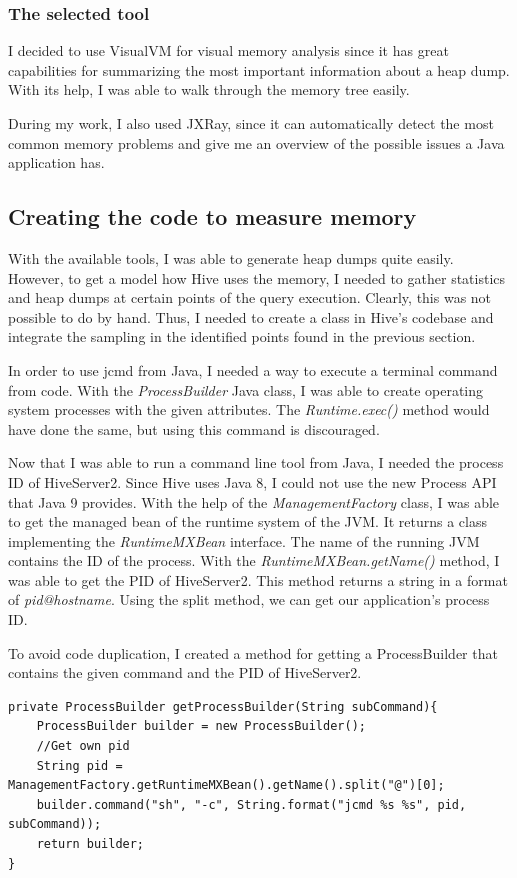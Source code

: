 \subsubsection{The selected tool}
I decided to use VisualVM for visual memory analysis since it has great capabilities for summarizing the most important information about a heap dump. With its help, I was able to walk through the memory tree easily.

During my work, I also used JXRay, since it can automatically detect the most common memory problems and give me an overview of the possible issues a Java application has.

\subsection{Creating the code to measure memory}
With the available tools, I was able to generate heap dumps quite easily. However, to get a model how Hive uses the memory, I needed to gather statistics and heap dumps at certain points of the query execution. Clearly, this was not possible to do by hand. Thus, I needed to create a class in Hive's codebase and integrate the sampling in the identified points found in the previous section.

In order to use jcmd from Java, I needed a way to execute a terminal command from code. With the \textit{ProcessBuilder} Java class, I was able to create operating system processes with the given attributes. The \textit{Runtime.exec()} method would have done the same, but using this command is discouraged. 

Now that I was able to run a command line tool from Java, I needed the process ID of HiveServer2. Since Hive uses Java 8, I could not use the new Process API that Java 9 provides. With the help of the \textit{ManagementFactory} class, I was able to get the managed bean of the runtime system of the JVM. It returns a class implementing the \textit{RuntimeMXBean} interface. The name of the running JVM contains the ID of the process. With the \textit{RuntimeMXBean.getName()} method, I was able to get the PID of HiveServer2. This method returns a string in a format of \textit{pid@hostname}. Using the split method, we can get our application's process ID.

To avoid code duplication, I created a method for getting a ProcessBuilder that contains the given command and the PID of HiveServer2.

\begin{lstlisting}
private ProcessBuilder getProcessBuilder(String subCommand){
	ProcessBuilder builder = new ProcessBuilder();
	//Get own pid
	String pid = ManagementFactory.getRuntimeMXBean().getName().split("@")[0];
	builder.command("sh", "-c", String.format("jcmd %s %s", pid, subCommand));
	return builder;
}
\end{lstlisting}

